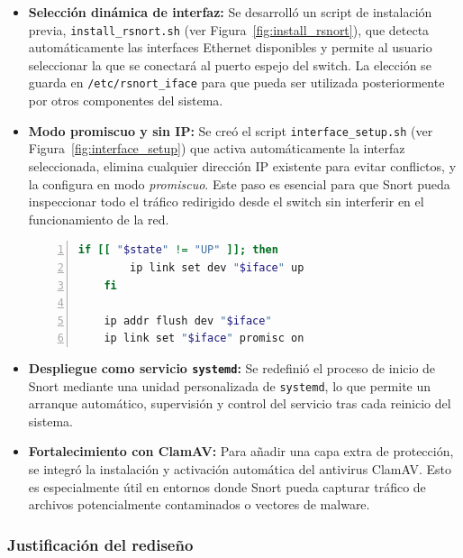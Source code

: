 \documentclass[11pt,a4paper,twoside]{report}
\begin{document}
\begin{itemize}
	\item \textbf{Selección dinámica de interfaz:} Se desarrolló un script de instalación previa, \texttt{install\_rsnort.sh} (ver Figura~\ref{fig:install_rsnort}), que detecta automáticamente las interfaces Ethernet disponibles y permite al usuario seleccionar la que se conectará al puerto espejo del switch. La elección se guarda en \texttt{/etc/rsnort\_iface} para que pueda ser utilizada posteriormente por otros componentes del sistema.
	
	\item \textbf{Modo promiscuo y sin IP:} Se creó el script \texttt{interface\_setup.sh} (ver Figura~\ref{fig:interface_setup}) que activa automáticamente la interfaz seleccionada, elimina cualquier dirección IP existente para evitar conflictos, y la configura en modo \textit{promiscuo}. Este paso es esencial para que Snort pueda inspeccionar todo el tráfico redirigido desde el switch sin interferir en el funcionamiento de la red.
	
	\begin{lstlisting}[language=bash, caption={Activación automática del modo promiscuo en interface\_setup.sh}, label=lst:promiscuo, basicstyle=\ttfamily\footnotesize, frame=single, numbers=left, numberstyle=\tiny, breaklines=true]
	if [[ "$state" != "UP" ]]; then
		ip link set dev "$iface" up
	fi
	
	ip addr flush dev "$iface"
	ip link set "$iface" promisc on
	\end{lstlisting}
	
	\item \textbf{Despliegue como servicio \texttt{systemd}:} Se redefinió el proceso de inicio de Snort mediante una unidad personalizada de \texttt{systemd}, lo que permite un arranque automático, supervisión y control del servicio tras cada reinicio del sistema.
	
	\item \textbf{Fortalecimiento con ClamAV:} Para añadir una capa extra de protección, se integró la instalación y activación automática del antivirus ClamAV. Esto es especialmente útil en entornos donde Snort pueda capturar tráfico de archivos potencialmente contaminados o vectores de malware.
\end{itemize}

\subsubsection{Justificación del rediseño}
\end{document}

